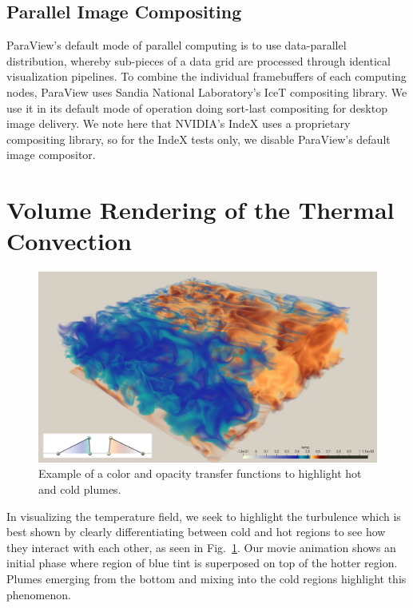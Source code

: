 \documentclass[5p,times]{elsarticle}
\begin{document}
\subsection{Parallel Image Compositing}

ParaView's default mode of parallel computing is to use data-parallel distribution,
whereby sub-pieces of a data grid are processed through identical visualization
pipelines. To combine the individual framebuffers of each computing nodes,
ParaView uses Sandia National Laboratory's IceT \cite{MorelandKPH11} compositing
library. We use it in its default mode of operation doing sort-last compositing
for desktop image delivery. We note here that NVIDIA's IndeX uses a proprietary
compositing library, so for the IndeX tests only, we disable ParaView's default
image compositor.

\section{Volume Rendering of the Thermal Convection}

\begin{figure}[!hbt]
	\centering
	\includegraphics[width=\linewidth]{zoom0000.pdf}%
	\caption{\label{fig:zoom} Example of a color and opacity transfer functions to highlight hot and cold plumes.}
\end{figure}


In visualizing the temperature field, we seek to highlight the turbulence which
is best shown by clearly differentiating between cold and hot regions to see how
they interact with each other, as seen in Fig.~\ref{fig:zoom}. Our movie animation
shows an initial phase where region of blue tint is superposed on top of the hotter
region. Plumes emerging from the bottom and mixing into the cold regions highlight
this phenomenon.
\end{document}
